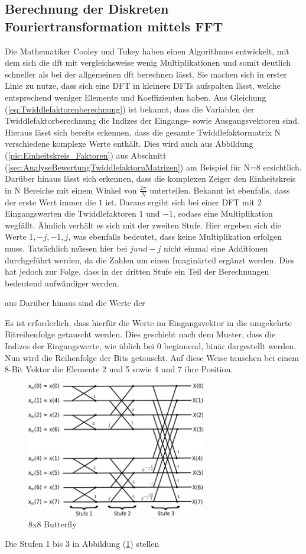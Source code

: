 \subsection{Berechnung der Diskreten Fouriertransformation mittels FFT}
Die Mathematiker Cooley und Tukey haben einen Algorithmus entwickelt, mit dem sich die \gls{dft} mit vergleichsweise wenig Multiplikationen
und somit deutlich schneller als bei der allgemeinen \gls{dft} berechnen lässt. Sie machen sich in erster Linie zu nutze, dass sich eine DFT
in kleinere DFTs aufspalten lässt, welche entsprechend weniger Elemente und Koeffizienten haben. Aus Gleichung (\ref{eq:Twiddlefaktorenberechnung}) ist 
bekannt, dass die Variablen der Twiddlefaktorberechnung die Indizes der Eingangs- sowie Ausgangsvektoren sind. Hieraus lässt sich bereits erkennen, dass
die gesamte Twiddlefaktormatrix N verschiedene komplexe Werte enthält. Dies wird auch aus Abbildung (\ref{pic:Einheitskreis_Faktoren}) aus Abschnitt 
(\ref{sec:AnalyseBewertungTwiddlefaktornMatrizen}) am Beispiel für N=8 ersichtlich. Darüber hinaus lässt sich erkennen, dass die komplexen Zeiger den Einheitskreis 
in N Bereiche mit einem Winkel von $\frac{2 \pi}{N}$ unterteilen. Bekannt ist ebenfalls, dass der erste Wert immer die $1$ ist.
Daraus ergibt sich bei einer DFT mit 2 Eingangswerten die Twiddlefaktoren $1$ und $-1$, sodass eine Multiplikation wegfällt. Ähnlich verhält es sich mit der zweiten Stufe.
Hier ergeben sich die Werte $1, -j, -1, j$, was ebenfalls bedeutet, dass keine Multiplikation erfolgen muss. Tatsächlich müssen hier bei $j und -j$ nicht einmal eine
Additionen durchgeführt werden, da die Zahlen um einen Imaginärteil ergänzt werden. Dies hat jedoch zur Folge, dass in der dritten Stufe ein Teil der Berechnungen bedeutend
aufwändiger werden. 


aus  Darüber hinaus sind die Werte der 

Es ist erforderlich, dass hierfür die Werte im Eingangsvektor in die umgekehrte Bitreihenfolge getauscht werden. Dies geschieht nach dem Muster, dass die Indizes der Eingangswerte, wie
üblich bei 0 beginnend, binär dargestellt werden. Nun wird die Reihenfolge der Bits getauscht. Auf diese Weise tauschen bei einem 8-Bit Vektor die
Elemente 2 und 5 sowie 4 und 7 ihre Position.


\begin{figure}[htbp]
 \centering
 \includegraphics[width=0.7\textwidth]{img/Butterfly.png}
 \caption{8x8 Butterfly}
 \label{pic:Butterfly}
\end{figure}


Die Stufen 1 bis 3 in Abbildung (\ref{pic:Butterfly}) stellen 